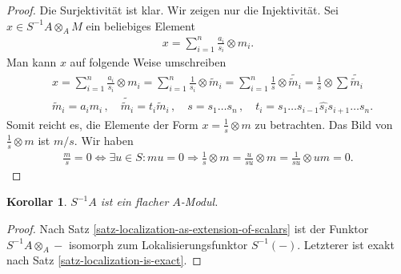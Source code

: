 \documentclass[reqno,12pt]{article}
\numberwithin{equation}{section}
\theoremstyle{plain}
\newtheorem{cor}[thm]{Korollar}
\theoremstyle{definition}
\newcommand{\blank}{{-}}
\begin{document}
\begin{proof}
Die Surjektivität ist klar. Wir zeigen nur die Injektivität. Sei $x \in S^{-1} A \otimes_A M$ ein beliebiges Element
\begin{align*}
x = \sum_{i=1}^n \frac{a_i}{s_i} \otimes m_i.
\end{align*}
Man kann $x$ auf folgende Weise umschreiben
\begin{align*}
& x = \sum_{i=1}^n \frac{a_i}{s_i} \otimes m_i = \sum_{i=1}^n \frac{1}{s_i} \otimes \widetilde{m}_i =  \sum_{i=1}^n \frac{1}{s} \otimes \widetilde{\widetilde{m}_i} = \frac{1}{s} \otimes \sum \widetilde{\widetilde{m}_i} \\
& \widetilde{m}_i = a_i m_i \, , \quad  \widetilde{\widetilde{m}_i} = t_i \widetilde{m}_i \, , \quad  s = s_1 \dots s_n \, , \quad t_i = s_1 \dots s_{i-1} \hat{s_i} s_{i+1} \dots s_n.
\end{align*}
Somit reicht es, die Elemente der Form $x=\frac{1}{s} \otimes m$ zu betrachten. Das Bild von $\frac{1}{s} \otimes m$ ist $m/s$. Wir haben
\begin{align*}
\frac{m}{s} = 0 \iff \exists u \in S \colon mu=0 \Rightarrow \frac{1}{s} \otimes m = \frac{u}{su} \otimes m = \frac{1}{su} \otimes um = 0.
\end{align*}
\end{proof}

\begin{cor}
$S^{-1} A$ ist ein flacher $A$-Modul.
\end{cor}

\begin{proof}
Nach Satz \ref{satz-localization-as-extension-of-scalars} ist der Funktor $S^{-1}A\otimes_A \blank$ isomorph zum Lokalisierungsfunktor $S^{-1}(\blank)$. Letzterer ist exakt nach Satz \ref{satz-localization-is-exact}.
\end{proof}
\end{document}
